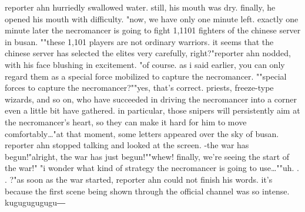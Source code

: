 reporter ahn hurriedly swallowed water.
 still, his mouth was dry.
 finally, he opened his mouth with difficulty.
"now, we have only one minute left.
 exactly one minute later the necromancer is going to fight 1,1101 fighters of the chinese server in busan.
""these 1,101 players are not ordinary warriors.
 it seems that the chinese server has selected the elites very carefully, right?"reporter ahn nodded, with his face blushing in excitement.
"of course.
 as i said earlier, you can only regard them as a special force mobilized to capture the necromancer.
""special forces to capture the necromancer?""yes, that's correct.
 priests, freeze-type wizards, and so on, who have succeeded in driving the necromancer into a corner even a little bit have gathered.
 in particular, those snipers will persistently aim at the necromancer's heart, so they can make it hard for him to move comfortably…"at that moment, some letters appeared over the sky of busan.
reporter ahn stopped talking and looked at the screen.
-the war has begun!"alright, the war has just begun!""whew! finally, we're seeing the start of the war!" "i wonder what kind of strategy the necromancer is going to use…""uh.
.
.
?"as soon as the war started, reporter ahn could not finish his words.
it's because the first scene being shown through the official channel was so intense.
kugugugugugu―

 